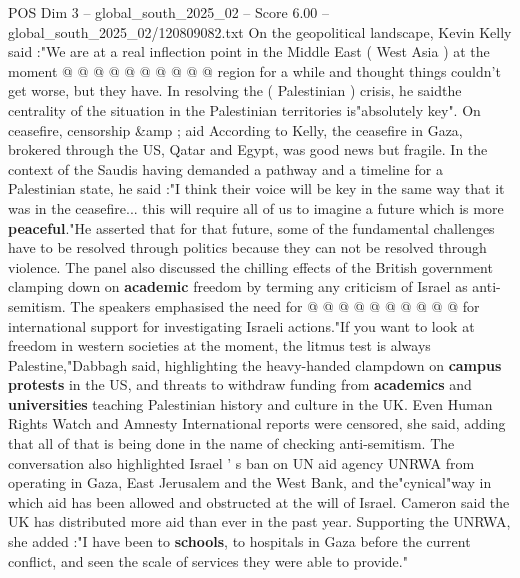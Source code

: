 \begin{textsample}{POS Dim 3 – global\_south\_2025\_02 – Score 6.00 – global\_south\_2025\_02/120809082.txt}
On the geopolitical landscape, Kevin Kelly said :"We are at a real inflection point in the Middle East ( West Asia ) at the moment @ @ @ @ @ @ @ @ @ @ region for a while and thought things couldn't get worse, but they have.
In resolving the ( Palestinian ) crisis, he saidthe centrality of the situation in the Palestinian territories is"absolutely key".
On ceasefire, censorship \&amp ; aid According to Kelly, the ceasefire in Gaza, brokered through the US, Qatar and Egypt, was good news but fragile.
In the context of the Saudis having demanded a pathway and a timeline for a Palestinian state, he said :"I think their voice will be key in the same way that it was in the ceasefire... this will require all of us to imagine a future which is more \textbf{peaceful}."He asserted that for that future, some of the fundamental challenges have to be resolved through politics because they can not be resolved through violence.
The panel also discussed the chilling effects of the British government clamping down on \textbf{academic} freedom by terming any criticism of Israel as anti-semitism.
The speakers emphasised the need for @ @ @ @ @ @ @ @ @ @ for international support for investigating Israeli actions."If you want to look at freedom in western societies at the moment, the litmus test is always Palestine,"Dabbagh said, highlighting the heavy-handed clampdown on \textbf{campus} \textbf{protests} in the US, and threats to withdraw funding from \textbf{academics} and \textbf{universities} teaching Palestinian history and culture in the UK.
Even Human Rights Watch and Amnesty International reports were censored, she said, adding that all of that is being done in the name of checking anti-semitism.
The conversation also highlighted Israel ' s ban on UN aid agency UNRWA from operating in Gaza, East Jerusalem and the West Bank, and the"cynical"way in which aid has been allowed and obstructed at the will of Israel.
Cameron said the UK has distributed more aid than ever in the past year.
Supporting the UNRWA, she added :"I have been to \textbf{schools}, to hospitals in Gaza before the current conflict, and seen the scale of services they were able to provide."

\end{textsample}
